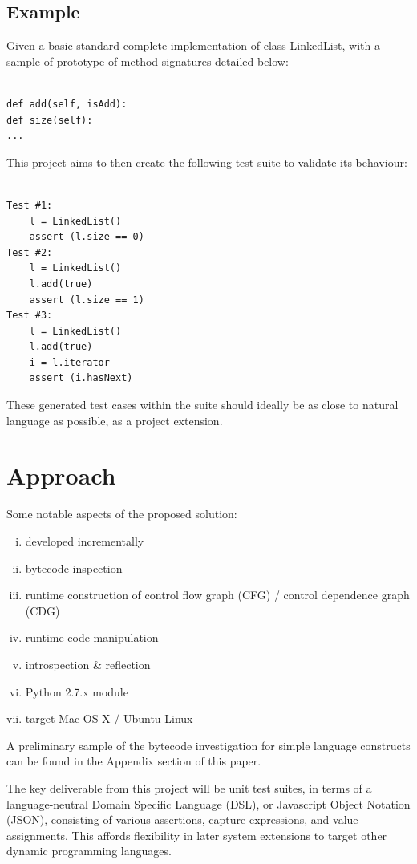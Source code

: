 \documentclass{icldt}
\numberwithin{equation}{section}       %
\begin{document}
{\subsection*{Example}
Given a basic standard complete implementation of class \textsf{LinkedList}, with a sample of prototype of method signatures detailed below:

\lstset{language=Python}          %
\begin{lstlisting}[frame=single]  % Start your code-block

def add(self, isAdd):
def size(self):
...
\end{lstlisting}

This project aims to then create the following test suite to validate its behaviour:

\begin{lstlisting}[frame=single]  % Start your code-block

Test #1:
	l = LinkedList()
	assert (l.size == 0)
Test #2:
	l = LinkedList()
	l.add(true)
	assert (l.size == 1)
Test #3:
	l = LinkedList()
	l.add(true)
	i = l.iterator
	assert (i.hasNext)
\end{lstlisting}

These generated test cases within the suite should ideally be as close to natural language as possible, as a project extension.
\section{Approach}
Some notable aspects of the proposed solution:
\begin{enumerate}[i.]
	\item developed incrementally
	\item bytecode inspection
	\item runtime construction of control flow graph (CFG) / control dependence graph (CDG)
	\item runtime code manipulation
	\item introspection \& reflection
	\item Python 2.7.x module
	\item target Mac OS X / Ubuntu Linux
\end{enumerate}

A preliminary sample of the bytecode investigation for simple language constructs can be found in the Appendix section of this paper.

The key deliverable from this project will be unit test suites, in terms of a language-neutral Domain Specific Language (DSL), or Javascript Object Notation (JSON), consisting of various assertions, capture expressions, and value assignments. This affords flexibility in later system extensions to target other dynamic programming languages.

}
\end{document}
